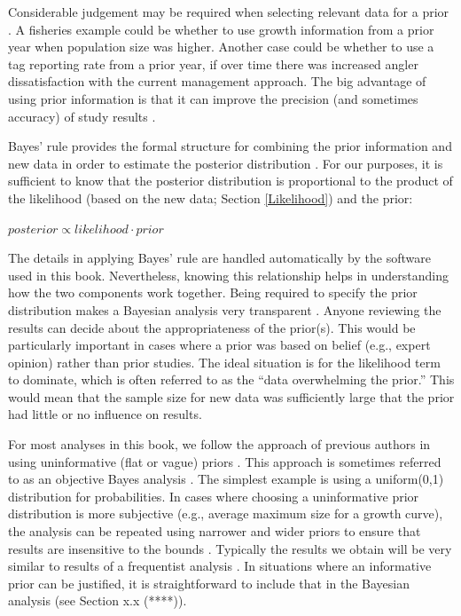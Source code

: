 \documentclass[
]{krantz}
\begin{document}
Considerable judgement may be required when selecting relevant data for a prior \citep{lunn.etal2012}. A fisheries example could be whether to use growth information from a prior year when population size was higher. Another case could be whether to use a tag reporting rate from a prior year, if over time there was increased angler dissatisfaction with the current management approach. The big advantage of using prior information is that it can improve the precision (and sometimes accuracy) of study results \citep[e.g.,][]{doll.jacquemin_2018}.

Bayes' rule provides the formal structure for combining the prior information and new data in order to estimate the posterior distribution \citep{link.etal_2002, kéry.schaub_2011}. For our purposes, it is sufficient to know that the posterior distribution is proportional to the product of the likelihood (based on the new data; Section \ref{Likelihood}) and the prior:

\(posterior \propto likelihood \cdot prior\)

The details in applying Bayes' rule are handled automatically by the software used in this book. Nevertheless, knowing this relationship helps in understanding how the two components work together. Being required to specify the prior distribution makes a Bayesian analysis very transparent \citep{kéry.schaub_2011}. Anyone reviewing the results can decide about the appropriateness of the prior(s). This would be particularly important in cases where a prior was based on belief (e.g., expert opinion) rather than prior studies. The ideal situation is for the likelihood term to dominate, which is often referred to as the ``data overwhelming the prior.'' This would mean that the sample size for new data was sufficiently large that the prior had little or no influence on results.

For most analyses in this book, we follow the approach of previous authors in using uninformative (flat or vague) priors \citep{royle.dorazio_2009, kéry.schaub_2011}. This approach is sometimes referred to as an objective Bayes analysis \citep{link.etal_2002}. The simplest example is using a uniform(0,1) distribution for probabilities. In cases where choosing a uninformative prior distribution is more subjective (e.g., average maximum size for a growth curve), the analysis can be repeated using narrower and wider priors to ensure that results are insensitive to the bounds \citep{kéry.schaub_2011}. Typically the results we obtain will be very similar to results of a frequentist analysis \citep{link.etal_2002, mccarthy2007, kéry_2010, kéry.schaub_2011}. In situations where an informative prior can be justified, it is straightforward to include that in the Bayesian analysis (see Section x.x (****)).
\end{document}
